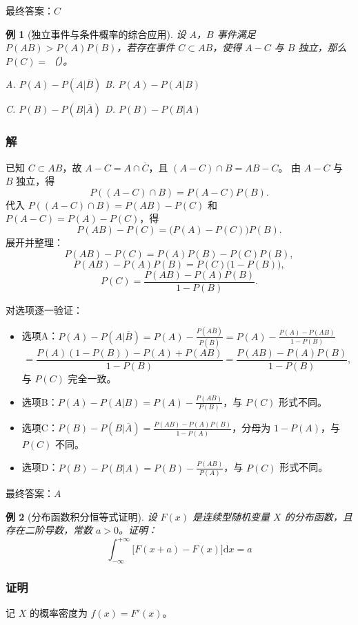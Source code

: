 \documentclass{book}
\newtheorem{example}{例}[subsection]
\begin{document}
最终答案：$\boxed{C}$

\begin{example}[独立事件与条件概率的综合应用]
设 $A$，$B$ 事件满足 $P(AB) > P(A)P(B)$，若存在事件 $C \subset AB$，使得 $A-C$ 与 $B$ 独立，那么 $P(C)=$（）。

A. $P(A) - P(A|\overline{B})$ \quad\quad B. $P(A) - P(A|B)$

C. $P(B) - P(B|\overline{A})$ \quad\quad D. $P(B) - P(B|A)$
\end{example}

\subsubsection{解}
已知 $C \subset AB$，故 $A-C = A \cap \overline{C}$，且 $(A-C) \cap B = AB - C$。
由 $A-C$ 与 $B$ 独立，得
\[
P((A-C) \cap B) = P(A-C)P(B).
\]
代入 $P((A-C) \cap B) = P(AB) - P(C)$ 和 $P(A-C) = P(A) - P(C)$，得
\[
P(AB) - P(C) = \bigl(P(A) - P(C)\bigr)P(B).
\]
展开并整理：
\[
P(AB) - P(C) = P(A)P(B) - P(C)P(B),
\]
\[
P(AB) - P(A)P(B) = P(C)\bigl(1 - P(B)\bigr),
\]
\[
P(C) = \frac{P(AB) - P(A)P(B)}{1 - P(B)}.
\]

对选项逐一验证：
\begin{itemize}
  \item 选项A：$P(A) - P(A|\overline{B}) = P(A) - \frac{P(A\overline{B})}{P(\overline{B})} = P(A) - \frac{P(A) - P(AB)}{1 - P(B)}$
  \[
  = \frac{P(A)(1 - P(B)) - P(A) + P(AB)}{1 - P(B)} = \frac{P(AB) - P(A)P(B)}{1 - P(B)},
  \]
  与 $P(C)$ 完全一致。
  \item 选项B：$P(A) - P(A|B) = P(A) - \frac{P(AB)}{P(B)}$，与 $P(C)$ 形式不同。
  \item 选项C：$P(B) - P(B|\overline{A}) = \frac{P(AB) - P(A)P(B)}{1 - P(A)}$，分母为 $1 - P(A)$，与 $P(C)$ 不同。
  \item 选项D：$P(B) - P(B|A) = P(B) - \frac{P(AB)}{P(A)}$，与 $P(C)$ 形式不同。
\end{itemize}

最终答案：$\boxed{A}$

\begin{example}[分布函数积分恒等式证明]
设 $F(x)$ 是连续型随机变量 $X$ 的分布函数，且存在二阶导数，常数 $a>0$。证明：
\[
\int_{-\infty}^{+\infty} \bigl[F(x+a) - F(x)\bigr] \mathrm{d}x = a
\]
\end{example}

\subsubsection{证明}
记 $X$ 的概率密度为 $f(x) = F'(x)$。
\end{document}
